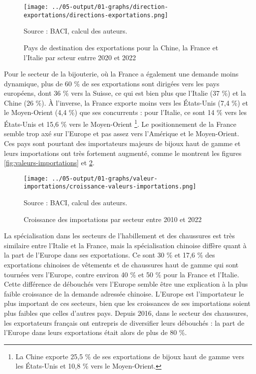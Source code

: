 \documentclass[french,10pt,a4paper]{article}
\begin{document}
\begin{figure}[!h]
  \centering
  \texttt{[image: ../05-output/01-graphs/direction-exportations/directions-exportations.png]}
  \captionsetup{justification=raggedright,singlelinecheck=false, font=small}
  \caption*{Source : BACI, calcul des auteurs.}
  \captionsetup{justification=centering, singlelinecheck=true, font=normalsize}
  \caption{Pays de destination des exportations pour la Chine, la France et l'Italie par scteur entrre 2020 et 2022}
  \label{fig:direction-exportations}
\end{figure}

Pour le secteur de la bijouterie, où la France a également une demande moins dynamique, plus de 60 \% de ses exportations sont dirigées vers les pays européens, dont 36 \% vers la Suisse, ce qui est bien plus que l'Italie (37 \%) et la Chine (26 \%). À l'inverse, la France exporte moins vers les États-Unis (7,4 \%) et le Moyen-Orient (4,4 \%) que ses concurrents : pour l'Italie, ce sont 14 \% vers les États-Unis et 15,6 \% vers le Moyen-Orient \footnote{La Chine exporte 25,5 \% de ses exportations de bijoux haut de gamme vers les États-Unis et 10,8 \% vers le Moyen-Orient.}. Le positionnement de la France semble trop axé sur l'Europe et pas assez vers l'Amérique et le Moyen-Orient. Ces pays sont pourtant des importateurs majeurs de bijoux haut de gamme et leurs importations ont très fortement augmenté, comme le montrent les figures \ref{fig:valeurs-importations} et \ref{fig:croissance-valeurs-importations}.

\begin{figure}[!h]
  \centering
  \texttt{[image: ../05-output/01-graphs/valeur-importations/croissance-valeurs-importations.png]}
  \captionsetup{justification=raggedright,singlelinecheck=false, font=small}
  \caption*{Source : BACI, calcul des auteurs.}
  \captionsetup{justification=centering, singlelinecheck=true, font=normalsize}
  \caption{Croissance des importations par secteur entre 2010 et 2022}
  \label{fig:croissance-valeurs-importations}
\end{figure}

La spécialisation dans les secteurs de l'habillement et des chaussures est très similaire entre l'Italie et la France, mais la spécialisation chinoise diffère quant à la part de l'Europe dans ses exportations. Ce sont 30 \% et 17,6 \% des exportations chinoises de vêtements et de chaussures haut de gamme qui sont tournées vers l'Europe, contre environ 40 \% et 50 \% pour la France et l’Italie. Cette différence de débouchés vers l'Europe semble être une explication à la plus faible croissance de la demande adressée chinoise. L'Europe est l'importateur le plus important de ces secteurs, bien que les croissances de ses importations soient plus faibles que celles d'autres pays. Depuis 2016, dans le secteur des chaussures, les exportateurs français ont entrepris de diversifier leurs débouchés : la part de l'Europe dans leurs exportations était alors de plus de 80 \%.
\end{document}
